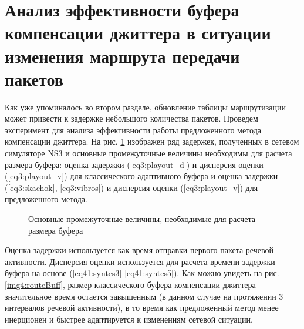 \section{Анализ эффективности буфера компенсации джиттера в ситуации изменения маршрута передачи пакетов} \label{sect4}



Как уже упоминалось во втором разделе, обновление таблицы маршрутизации может привести к задержке небольшого количества пакетов. Проведем эксперимент для анализа эффективности работы предложенного метода компенсации джиттера. 
На рис. \ref{img4:routeEst} изображен ряд задержек, полученных в сетевом симуляторе NS3 и основные промежуточные величины необходимы для расчета размера буфера: 
оценка задержки (\ref{eq3:playout_d}) и дисперсия оценки (\ref{eq3:playout_v}) для  классического адаптивного буфера \cite{Ramjee} и 
оценка задержки (\ref{eq3:skachok}, \ref{eq3:vibros}) и дисперсия оценки (\ref{eq3:playout_v}) для предложенного метода.






\pgfplotsset{width=15cm, height=10cm, compat=1.3}
\begin{figure} [!ht]
  \center
{}
\caption{Основные промежуточные величины, необходимые для расчета размера буфера}
  \label{img4:routeEst}
\end{figure}


Оценка задержки используется как время отправки первого пакета речевой активности.
Дисперсия оценки используется для расчета времени задержки буфера на основе (\ref{eq41:syntes3}-\ref{eq41:syntes5}).
Как можно увидеть на рис. \ref{img4:routeBuff}, размер классического буфера компенсации джиттера значительное время остается завышенным (в данном случае на протяжении 3 интервалов речевой активности),
в то время как предложенный метод менее инерционен и быстрее адаптируется к изменениям сетевой ситуации.


